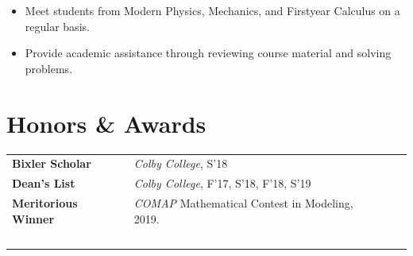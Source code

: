 \documentclass[a4paper, 10.5pt]{article}
\begin{document}
	\begin{itemize}[noitemsep, nolistsep]
		\setlength{\itemindent}{0.2in}
		\item Meet students from Modern Physics, Mechanics, and First\textendash year Calculus on a regular basis.
		\item Provide academic assistance through reviewing course material and solving problems.\\
	\end{itemize}

	\section*{\normalsize{{\color{colby}Honors \& Awards}}}
	\begin{tabular}{lp{13.5cm}lp{2in}}
		\textbf{Bixler Scholar} & \textit{Colby College}, S'18\textemdash \\
		\textbf{Dean's List} & \textit{Colby College}, F'17, S'18, F'18, S'19\\
		\textbf{Meritorious Winner} & \textit{COMAP} Mathematical Contest in Modeling, 2019. \\
		$\,$
	\end{tabular}
	
\end{document}
